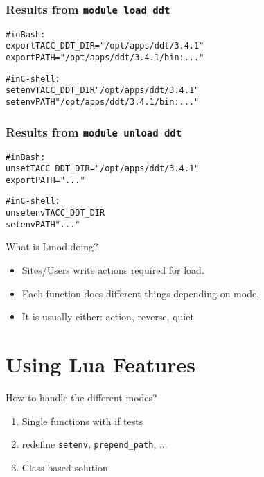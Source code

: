 \documentclass{beamer}
\begin{document}
\begin{frame}[fragile]
    \frametitle{Results from \texttt{module load ddt}}
    {\small
      \begin{alltt}
          # in Bash:
          export TACC_DDT_DIR="/opt/apps/ddt/3.4.1"
          export PATH="/opt/apps/ddt/3.4.1/bin:..."

          # in C-shell:
          setenv TACC_DDT_DIR "/opt/apps/ddt/3.4.1"
          setenv PATH         "/opt/apps/ddt/3.4.1/bin:..."
      \end{alltt}
    }
\end{frame}    

\begin{frame}[fragile]
    \frametitle{Results from \texttt{module unload ddt}}
    {\small
      \begin{alltt}
          # in Bash:
          unset TACC_DDT_DIR="/opt/apps/ddt/3.4.1"
          export PATH="..."

          # in C-shell:
          unsetenv TACC_DDT_DIR
          setenv   PATH         "..."
      \end{alltt}
    }
\end{frame}    

\begin{frame}{What is Lmod doing?}
  \begin{itemize}
    \item Sites/Users write actions required for load.
    \item Each function does different things depending on mode.
    \item It is usually either: action, reverse, quiet
  \end{itemize}
\end{frame}

\section{Using Lua Features}

\begin{frame}{How to handle the different modes?}
  \begin{enumerate}
    \item Single functions with if tests
    \item redefine \texttt{setenv}, \texttt{prepend\_path}, ...
    \item Class based solution
  \end{enumerate}
\end{frame}
\end{document}
